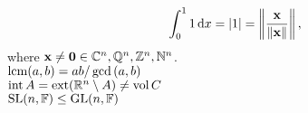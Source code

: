 \documentclass[varwidth]{standalone}
\begin{document}
\[
  \int_{0}^{1} 1 \,\mathrm{d} x = \lvert1\rvert = \left\lVert\frac{\boldsymbol{\mathbf{x}}}{\lVert\boldsymbol{\mathbf{x}}\rVert}\right\rVert,
\]
where $\boldsymbol{\mathbf{x}} \ne \mathbf{0} \in \mathbb{C}^n, \mathbb{Q}^n, \mathbb{Z}^n,
\mathbb{N}^n$.\\
$\mathop{\mathrm{lcm}}(a,b)=ab/\gcd{(a,b)}$\\
$\mathop{\mathrm{int}} A=\mathop{\mathrm{ext}} (\mathbb{R}^n \setminus A) \ne \mathop{\mathrm{vol}} C$\\
$\mathrm{SL}(n,\mathbb{F}) \le \mathrm{GL}(n,\mathbb{F})$
\end{document}
